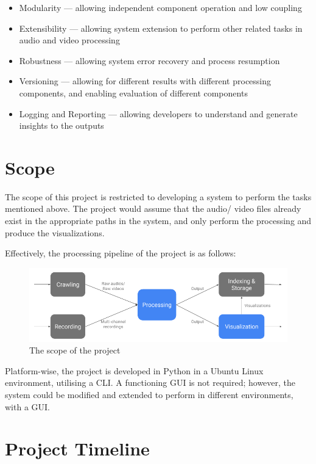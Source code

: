 \begin{itemize}
    \item Modularity --- allowing independent component operation and low coupling
    \item Extensibility --- allowing system extension to perform other related
    tasks in audio and video processing
    \item Robustness --- allowing system error recovery and process resumption
    \item Versioning --- allowing for different results with different processing
    components, and enabling evaluation of different components
    \item Logging and Reporting --- allowing developers to understand and generate
    insights to the outputs
\end{itemize}

\section{Scope}

The scope of this project is restricted to developing a system to perform the
tasks mentioned above. The project would assume that the audio/ video files
already exist in the appropriate paths in the system, and only perform the
processing and produce the visualizations.

Effectively, the processing pipeline of the project is as follows:

\begin{figure}[h]
\begin{center}
    \includegraphics[width=\textwidth]{../images/pipeline_effective.png}
    \caption{The scope of the project}
\end{center}
\end{figure}
    
Platform-wise, the project is developed in Python in a Ubuntu Linux environment,
utilising a CLI. A functioning GUI is not required; however, the system could
be modified and extended to perform in different environments, with a GUI\@.

\section{Project Timeline}

